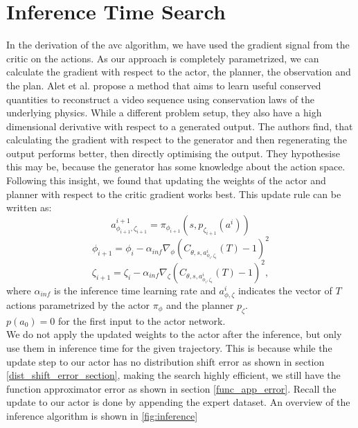 \section{Inference Time Search}
\label{sec:inf_time_search}
In the derivation of the \ac{avc} algorithm, we have used the gradient signal from the critic on the actions. As our approach is completely parametrized, we can calculate 
the gradient with respect to the actor, the planner, the observation and the plan. Alet et al. \cite{alet2021noether} propose a method that aims 
to learn useful conserved quantities to reconstruct a video sequence 
using conservation laws of the underlying physics. While a different problem setup, they also have a high dimensional derivative with respect to a 
generated output. The authors find, that 
calculating the gradient with respect to the generator and then regenerating the output performs better, then directly optimising the output. They hypothesise this 
may be, because the generator has some knowledge about the action space. Following this insight, we found that updating the weights of the actor and planner 
with respect to the critic gradient works best. This update rule can be written as:
\begin{equation*}
    a^{i+1}_{\phi_{i+1}, \zeta_{i+1}} = \pi_{\phi_{i+1}}(s, p_{\zeta_{i+1}}(a^i))
\end{equation*}
\begin{equation*}
    \phi_{i+1} = \phi_i - \alpha_{inf} \nabla_{\phi} (C_{\theta, s, a^{i}_{\phi_{i}, \zeta_{i}}}(T) - 1)^2
\end{equation*}
\begin{equation}
    \zeta_{i+1} = \zeta_i - \alpha_{inf} \nabla_{\zeta} (C_{\theta, s, a^{i}_{\phi_{i}, \zeta_{i}}}(T) - 1)^2,
\end{equation}
where $\alpha_{inf}$ is the inference time learning rate and $a^{i}_{\phi, \zeta}$ indicates the vector of $T$ actions parametrized by the 
actor $\pi_{\phi}$ and the planner $p_\zeta$.\\ 

$p(a_0) = 0$ for the first input to the actor network. \\

We do not apply the updated weights to the actor after the inference, but only use them in inference time for the given trajectory. This is because while the update step to our 
actor has no distribution shift error as shown in section \ref{dist_shift_error_section}, making the search highly efficient, we still have the function approximator error as 
shown in section \ref{func_app_error}. Recall the update to our actor is done by appending the expert dataset. An overview of the inference 
algorithm is shown in \ref{fig:inference}

